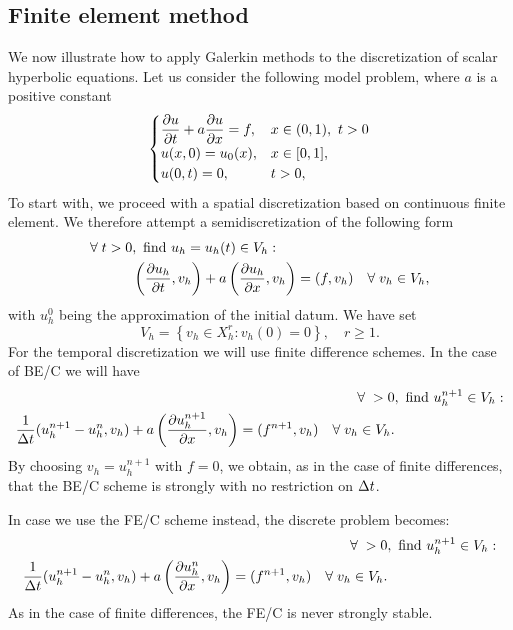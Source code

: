 \subsection{Finite element method}
We now illustrate how to apply Galerkin methods to the discretization of scalar hyperbolic equations. Let us consider the following model problem, where \(a\) is a positive constant
\begin{equation}
    \begin{cases}
        \displaystyle \partialderivative{u}{t} + a \partialderivative{u}{x} = f, & x \in (0,1), \ t > 0 \\
        u(x,0) = u_0(x), & x \in [0,1], \\
        u(0,t) = 0, & t > 0,
    \end{cases}
    \label{36_hyp}
\end{equation}
To start with, we proceed with a spatial discretization based on continuous finite element. We therefore attempt a semidiscretization of the following form 
\begin{equation}
    \begin{split}
        \forall \; t > 0&, \ \find u_h = u_h(t) \in V_h : \\
        &\left( \partialderivative{u_h}{t}, v_h \right) + a\left( \partialderivative{u_h}{x}, v_h \right) = (f,v_h) \quad \forall \; v_h \in V_h,
    \end{split}
    \label{37_hyp}
\end{equation}
with \(u_h^0\) being the approximation of the initial datum. We have set 
\[
    V_h = \left\{ v_h \in X_h^r : v_h(0) = 0 \right\}, \quad r \geq 1.
\]
For the temporal discretization we will use finite difference schemes. In the case of BE/C we will have 
\begin{equation}
    \begin{split}
        \forall \; > 0&, \ \find u^{n+1}_h \in V_h : \\
        \frac{1}{\tstep} (u_h^{n+1}- u_h^n, v_h) + a\left( \partialderivative{u_h^{n+1}}{x}, v_h \right) = (f^{n+1}, v_h) \quad \forall \; v_h \in V_h.
    \end{split}
    \label{38_hyp}
\end{equation}
By choosing \(v_h = u_h^{n+1}\) with \(f=0\), we obtain, as in the case of finite differences, that the BE/C scheme is strongly with no restriction on \(\Delta t\). 

In case we use the FE/C scheme instead, the discrete problem becomes: 
\begin{equation}
    \begin{split}
        \forall \; > 0&, \ \find u^{n+1}_h \in V_h : \\
        \frac{1}{\tstep} (u_h^{n+1}- u_h^n, v_h) + a\left( \partialderivative{u_h^{n}}{x}, v_h \right) = (f^{n+1}, v_h) \quad \forall \; v_h \in V_h.
    \end{split}
    \label{39_hyp}
\end{equation}
As in the case of finite differences, the FE/C is never strongly stable. 

